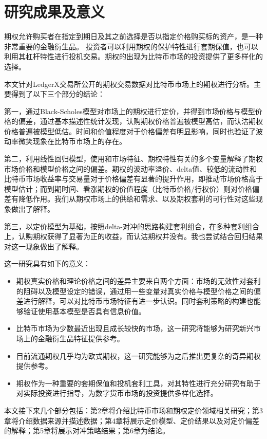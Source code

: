\section{研究成果及意义}
期权允许购买者在指定到期日及其之前选择是否以指定价格购买标的资产，是一种非常重要的金融衍生品。
投资者可以利用期权的保护特性进行套期保值，也可以利用其杠杆特性进行投机交易。期权的出现为比特币市场的投资提供了更多样化的选择。
\par{本文针对LedgerX交易所公开的期权交易数据对比特币市场上的期权进行分析。主要得到了以下三个部分的结论：}
\par{第一，通过Black-Scholes模型对市场上的期权进行定价，并得到市场价格与模型价格的偏差，通过基本描述性统计发现，认购期权价格普遍被模型高估，而认沽期权价格普遍被模型低估。时间和价值程度对于价格偏差有明显影响，同时也验证了波动率微笑现象在比特币市场上的存在。}
\par{第二，利用线性回归模型，使用和市场特征、期权特性有关的多个变量解释了期权市场价格和模型价格之间的偏差。期权的波动率溢价、delta值、较低的流动性和比特币市场收益率与交易量对于价格偏差有显著的提升作用，即推动市场价格高于模型估计；而到期时间、看涨期权的价值程度（比特币价格/行权价）则对价格偏差有降低作用。我们从期权市场上的供给和需求、以及期权套利的可行性对这些现象做出了解释。}
\par{第三，以定价模型为基础，按照delta-对冲的思路构建套利组合，在多种套利组合上，认购期权获得了显著为正的收益，而认沽期权并没有。我也尝试结合回归结果对这一现象做出了解释。}
\par{这一研究具有如下的意义：}
\begin{itemize}
    \item 期权真实价格和理论价格之间的差异主要来自两个方面：市场的无效性对套利的阻碍以及模型设定的错误，通过用一些变量对真实价格与模型价格之间的偏差进行解释，可以对比特币市场特征有进一步认识。同时套利策略的构建也能够验证使用基本模型是否具有信息价值。
    \item  比特币市场为少数最近出现且成长较快的市场，这一研究将能够为研究新兴市场上的金融衍生品特征提供参考。
    \item 目前流通期权几乎均为欧式期权，这一研究能够为之后推出更复杂的奇异期权提供参考。
    \item 期权作为一种重要的套期保值和投机套利工具，对其特性进行充分研究有助于对实际投资进行指导，为数字货币市场的投资提供多样化选择。
  \end{itemize}
  
本文接下来几个部分包括：第2章将介绍比特币市场和期权定价领域相关研究；第3章将介绍数据来源并描述数据；第4章将展示定价模型、定价结果以及对定价偏差的解释；第5章将展示对冲策略结果；第6章为结论。